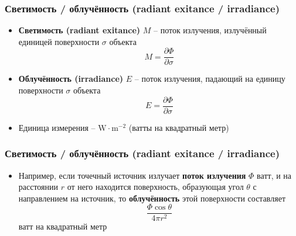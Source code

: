 \documentclass[10pt]{beamer}
\begin{document}
\begin{frame}
\frametitle{Светимость / облучённость (radiant exitance / irradiance)}
\begin{itemize}
\item \textbf{Светимость (radiant exitance)} \begin{math}M\end{math} -- поток излучения, излучённый единицей поверхности \begin{math}\sigma\end{math} объекта
\begin{equation*}
M = \frac{\partial \Phi}{\partial \sigma}
\end{equation*}
\pause
\item \textbf{Облучённость (irradiance)} \begin{math}E\end{math} -- поток излучения, падающий на единицу поверхности \begin{math}\sigma\end{math} объекта
\begin{equation*}
E = \frac{\partial \Phi}{\partial \sigma}
\end{equation*}
\pause
\item Единица измерения -- \begin{math}\text{W}\cdot \text{m}^{-2}\end{math} (ватты на квадратный метр)
\end{itemize}
\end{frame}

\begin{frame}
\frametitle{Светимость / облучённость (radiant exitance / irradiance)}
\begin{itemize}
\item Например, если точечный источник излучает \textbf{поток излучения} \begin{math}\Phi\end{math} ватт, и на расстоянии \begin{math}r\end{math} от него находится поверхность, образующая угол \begin{math}\theta\end{math} с направлением на источник, то \textbf{облучённость} этой поверхности составляет \begin{equation*}\frac{\Phi\cos\theta}{4\pi r^2}\end{equation*} ватт на квадратный метр
\end{itemize}
\end{frame}
\end{document}
